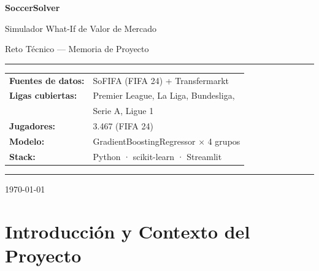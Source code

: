 \documentclass[12pt,a4paper]{report}
\begin{document}

\begin{titlepage}
  \centering
  \vspace*{2cm}

  {\Huge\bfseries\color{primary} SoccerSolver\par}
  \vspace{0.4cm}
  {\Large\color{accent} Simulador What-If de Valor de Mercado\par}
  \vspace{0.4cm}
  {\large\color{gray} Reto Técnico --- Memoria de Proyecto\par}

  \vspace{2cm}
  \rule{\linewidth}{0.5pt}
  \vspace{0.5cm}

  \begin{center}
    \begin{tabular}{ll}
      \textbf{Fuentes de datos:} & SoFIFA (FIFA 24) + Transfermarkt \\[4pt]
      \textbf{Ligas cubiertas:}  & Premier League, La Liga, Bundesliga, \\
                                  & Serie A, Ligue 1 \\[4pt]
      \textbf{Jugadores:}        & 3.467 (FIFA 24) \\[4pt]
      \textbf{Modelo:}           & GradientBoostingRegressor $\times$ 4 grupos \\[4pt]
      \textbf{Stack:}            & Python · scikit-learn · Streamlit \\
    \end{tabular}
  \end{center}

  \vspace{0.5cm}
  \rule{\linewidth}{0.5pt}
  \vspace{2cm}

  {\large\today\par}
\end{titlepage}

\tableofcontents
\newpage

\chapter{Introducción y Contexto del Proyecto}
\end{document}
